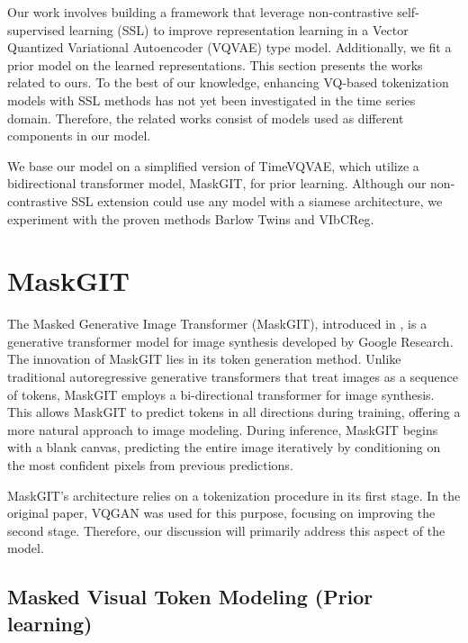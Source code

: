 \documentclass[../../thesis.tex]{subfiles}
\begin{document}
Our work involves building a framework that leverage non-contrastive self-supervised learning (SSL) to improve representation learning in a Vector Quantized Variational Autoencoder (VQVAE) type model. Additionally, we fit a prior model on the learned representations. This section presents the works related to ours. To the best of our knowledge, enhancing VQ-based tokenization models with SSL methods has not yet been investigated in the time series domain. Therefore, the related works consist of models used as different components in our model.\newline

We base our model on a simplified version of TimeVQVAE, which utilize a bidirectional transformer model, MaskGIT, for prior learning. Although our non-contrastive SSL extension could use any model with a siamese architecture, we experiment with the proven methods Barlow Twins and VIbCReg.

\section{MaskGIT}

The Masked Generative Image Transformer (MaskGIT), introduced in \cite{chang2022maskgit}, is a generative transformer model for image synthesis developed by Google Research. The innovation of MaskGIT lies in its token generation method. Unlike traditional autoregressive generative transformers that treat images as a sequence of tokens, MaskGIT employs a bi-directional transformer for image synthesis. This allows MaskGIT to predict tokens in all directions during training, offering a more natural approach to image modeling. During inference, MaskGIT begins with a blank canvas, predicting the entire image iteratively by conditioning on the most confident pixels from previous predictions.\newline

MaskGIT's architecture relies on a tokenization procedure in its first stage. In the original paper, VQGAN \cite{VQGAN} was used for this purpose, focusing on improving the second stage. Therefore, our discussion will primarily address this aspect of the model.

\subsection{Masked Visual Token Modeling (Prior learning)}
\end{document}
